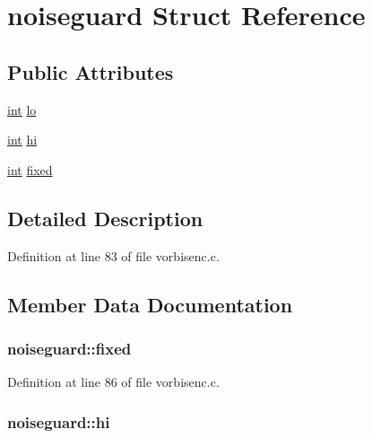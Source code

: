 \hypertarget{structnoiseguard}{}\section{noiseguard Struct Reference}
\label{structnoiseguard}
\subsection*{Public Attributes}
\begin{DoxyCompactItemize}
\item 
\hyperlink{xmltok_8h_a5a0d4a5641ce434f1d23533f2b2e6653}{int} \hyperlink{structnoiseguard_a536d7b7c61ad24a4f7b490f663d43dad}{lo}
\item 
\hyperlink{xmltok_8h_a5a0d4a5641ce434f1d23533f2b2e6653}{int} \hyperlink{structnoiseguard_a88d4adfe32e7ee064bf0319b8f41c0ac}{hi}
\item 
\hyperlink{xmltok_8h_a5a0d4a5641ce434f1d23533f2b2e6653}{int} \hyperlink{structnoiseguard_ac88cd650c02dd24cc058373fd693bdca}{fixed}
\end{DoxyCompactItemize}


\subsection{Detailed Description}


Definition at line 83 of file vorbisenc.\+c.



\subsection{Member Data Documentation}
\subsubsection[{\texorpdfstring{fixed}{fixed}}]{ noiseguard\+::fixed}\hypertarget{structnoiseguard_ac88cd650c02dd24cc058373fd693bdca}{}\label{structnoiseguard_ac88cd650c02dd24cc058373fd693bdca}


Definition at line 86 of file vorbisenc.\+c.

\subsubsection[{\texorpdfstring{hi}{hi}}]{ noiseguard\+::hi}\hypertarget{structnoiseguard_a88d4adfe32e7ee064bf0319b8f41c0ac}{}\label{structnoiseguard_a88d4adfe32e7ee064bf0319b8f41c0ac}


